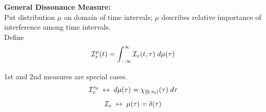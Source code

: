 \documentclass{slides}
\def\integral{\int_{-\infty}^{\infty}}
\begin{document}

\begin{slide}%
{\bf General Dissonance Measure:}\\
Put distribution $\mu$ on domain of time intervals; $\mu$
describes relative importance of interference among time intervals.\\
Define 
\begin{equation*}
\I_x^{\mu}(t) = \integral \I_x(t,\tau)\; d\mu(\tau)
\end{equation*}

1st and 2nd measures are special cases. 
\[
\mathcal{I}_x^{\tau_0} \; \leftrightarrow \; d\mu(\tau) =
\chi_{[0,\tau_0)}(\tau)\;d\tau
\]
\[
\mathcal{I}_x \; \leftrightarrow \; \mu(\tau) =\delta(\tau)
\]
\end{slide}
\end{document}
